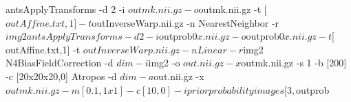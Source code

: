 antsApplyTransforms -d 2 -i ${out}mk.nii.gz -o ${out}mk.nii.gz -t [${out}Affine.txt,1] -t ${out}InverseWarp.nii.gz -n NearestNeighbor -r $img2 
  antsApplyTransforms -d 2 -i ${out}prob0${x}.nii.gz -o ${out}prob0${x}.nii.gz -t [${out}Affine.txt,1] -t ${out}InverseWarp.nii.gz -n Linear  -r $img2 
N4BiasFieldCorrection -d $dim -i $img2 -o ${out}.nii.gz -x ${out}mk.nii.gz -s 1 -b [200] -c [20x20x20,0] 
Atropos -d $dim -a ${out}.nii.gz -x ${out}mk.nii.gz -m [ 0.1,1x1]   -c [10,0]  -i priorprobabilityimages[3,${out}prob%
